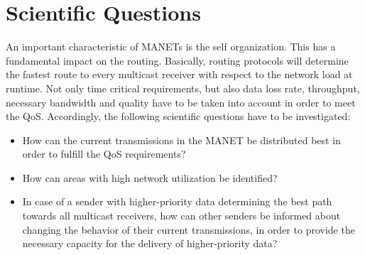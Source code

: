 \documentclass[runningheads]{llncs}
\newcommand{\MANET}{MANET}
\newcommand{\QOS}{QoS}
\begin{document}
	\section{Scientific Questions}
	An important characteristic of \MANET{s} is the self organization. This has a fundamental impact on the routing. Basically, routing protocols will determine the fastest route to every multicast receiver with respect to the network load at runtime. Not only time critical requirements, but also data loss rate, throughput, necessary bandwidth and quality have to be taken into account in order to meet the \QOS{}. Accordingly, the following scientific questions have to be investigated:
	\begin{itemize}
		\item How can the current transmissions in the \MANET{} be distributed best in order to fulfill the \QOS{} requirements? 
		\item How can areas with high network utilization be identified?
		\item In case of a sender with higher-priority data determining the best path towards all multicast receivers, how can other senders be informed about changing the behavior of their current transmissions, in order to provide the necessary capacity for the delivery of higher-priority data?
	\end{itemize}
\end{document}
